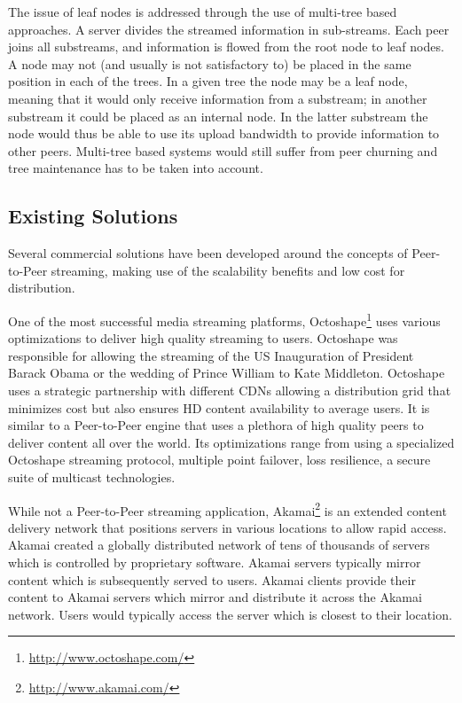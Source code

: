 The issue of leaf nodes is addressed through the use of multi-tree based
approaches. A server divides the streamed information in sub-streams. Each
peer joins all substreams, and information is flowed from the root node to
leaf nodes. A node may not (and usually is not satisfactory to) be placed in the
same position in each of the trees. In a given tree the node may be a leaf
node, meaning that it would only receive information from a substream; in
another substream it could be placed as an internal node. In the latter
substream the node would thus be able to use its upload bandwidth to provide
information to other peers. Multi-tree based systems would still suffer from
peer churning and tree maintenance has to be taken into account.

\subsection{Existing Solutions}
\label{subsec:p2p-systems:solutions}

Several commercial solutions have been developed around the concepts of
Peer-to-Peer streaming, making use of the scalability benefits and low cost
for distribution.

One of the most successful media streaming platforms,
Octoshape\footnote{\url{http://www.octoshape.com/}} uses various optimizations to
deliver high quality streaming to users.  Octoshape was responsible for
allowing the streaming of the US Inauguration of President Barack Obama or the
wedding of Prince William to Kate Middleton.  Octoshape uses a strategic
partnership with different CDNs allowing a distribution grid that minimizes
cost but also ensures HD content availability to average users. It is similar to
a Peer-to-Peer engine that uses a plethora of high quality peers to deliver
content all over the world. Its optimizations range from using a specialized
Octoshape streaming protocol, multiple point failover, loss resilience, a
secure suite of multicast technologies.

While not a Peer-to-Peer streaming application,
Akamai\footnote{\url{http://www.akamai.com/}} is an extended content delivery
network that positions servers in various locations to allow rapid access.
Akamai created a globally distributed network of tens of thousands of servers
which is controlled by proprietary software. Akamai servers typically mirror
content which is subsequently served to users. Akamai clients provide their
content to Akamai servers which mirror and distribute it across the Akamai
network. Users would typically access the server which is closest to their
location.

